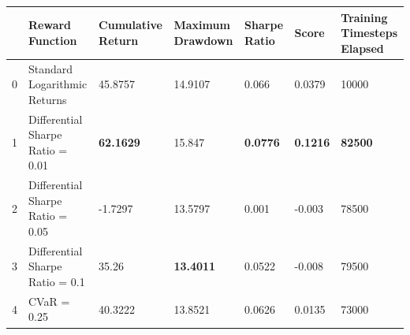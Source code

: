 \begin{tabular}{lllllll}
\toprule
 & Reward Function & Cumulative Return & Maximum Drawdown & Sharpe Ratio & Score & Training Timesteps Elapsed \\
\midrule
0 & Standard Logarithmic Returns & 45.8757 & 14.9107 & 0.066 & 0.0379 & 10000 \\
1 & Differential Sharpe Ratio = 0.01 & \textbf{62.1629} & 15.847 & \textbf{0.0776} & \textbf{0.1216} & \textbf{82500} \\
2 & Differential Sharpe Ratio = 0.05 & -1.7297 & 13.5797 & 0.001 & -0.003 & 78500 \\
3 & Differential Sharpe Ratio = 0.1 & 35.26 & \textbf{13.4011} & 0.0522 & -0.008 & 79500 \\
4 & CVaR = 0.25 & 40.3222 & 13.8521 & 0.0626 & 0.0135 & 73000 \\
\bottomrule
\end{tabular}
